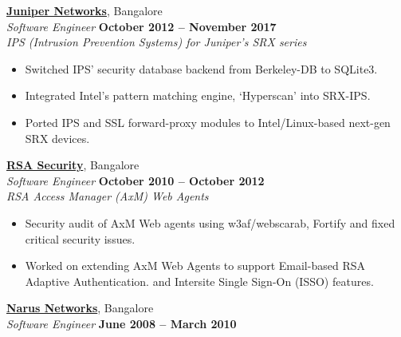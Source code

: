 \documentclass[9pt]{article}
\begin{document}
    \href{http://www.juniper.net}{\textbf{Juniper Networks}}, Bangalore \\%
    \textsl{Software Engineer} \hfill \textbf{October 2012 -- November 2017}\\%
    
	\textsl{IPS (Intrusion Prevention Systems) for Juniper's SRX series}
	\begin{itemize}
		\item Switched IPS' security database backend from Berkeley-DB to SQLite3.%
        \item Integrated Intel's pattern matching engine, `Hyperscan' into SRX-IPS.%
		\item Ported IPS and SSL forward-proxy modules to Intel/Linux-based next-gen SRX devices.\vspace{1mm}\\\vspace{1mm}%
	\end{itemize}

    \href{http://www.rsa.com/}{\textbf{RSA Security}}, Bangalore \\%
    \textsl{Software Engineer} \hfill \textbf{October 2010 -- October 2012}\\%
    
	\textsl{RSA Access Manager (AxM) Web Agents}
	\begin{itemize}
		\item Security audit of AxM Web agents using w3af/webscarab, Fortify and fixed critical security issues. %
		\item Worked on extending AxM Web Agents to support Email-based RSA Adaptive Authentication. and Intersite Single Sign-On (ISSO) features.\vspace{0mm}\\\vspace{1mm}%
	\end{itemize}

    \pagebreak %

    \href{https://en.wikipedia.org/wiki/Narus_(company)}{\textbf{Narus Networks}}, Bangalore \\%
    \textsl{Software Engineer} \hfill \textbf{June 2008 -- March 2010}\\%
	
\end{document}
